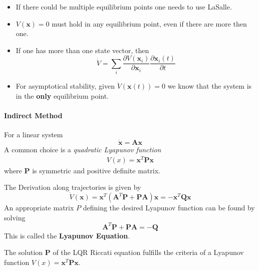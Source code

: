 \newpar{}
\begin{itemize}
    \item If there could be multiple equilibrium points one needs to use LaSalle.
    \item $V(\mathbf{x})=0$ must hold in any equilibrium point, even if there are more then one.
    \item If one has more than one state vector, then
          \begin{equation*}
              \dot{V}=\sum_{i} \frac{\partial V(\mathbf{x}_i)}{\partial \mathbf{x}_i} \frac{\partial \mathbf{x}_i(t)}{\partial t}
          \end{equation*}
    \item For asymptotical stability, given $\dot{V}(\mathbf{x}(t)) = 0$ we know that the system is in the \textbf{only} equilibrium point.
\end{itemize}

\paragraph{Indirect Method}
For a linear system
\begin{equation*}
    \dot{\mathbf{x}} = \mathbf{Ax}
\end{equation*}
A common choice is a \textit{quadratic Lyapunov function}
\begin{align*}
    V(x) = \mathbf{x}^{T}\mathbf{Px}
\end{align*}
where $\mathbf{P}$ is symmetric and positive definite matrix.

The Derivation along trajectories is given by
\begin{equation*}
    \dot{V}(\mathbf{x}) = \mathbf{x}^{T}\left(\mathbf{A}^{T}\mathbf{P+PA}\right)\mathbf{x} = - \mathbf{x}^{T}\mathbf{Qx}
\end{equation*}
An appropriate matrix $P$ defining the desired Lyapunov function can be found by solving
\begin{equation*}
    \mathbf{A}^{T}\mathbf{P+PA=-Q}
\end{equation*}
This is called the \textbf{Lyapunov Equation}.

\newpar{}

The solution $\mathbf{P}$ of the LQR Riccati equation fulfills the criteria of a Lyapunov function $V(x) = \mathbf{x}^{T}\mathbf{Px}$.

\newpar{}

